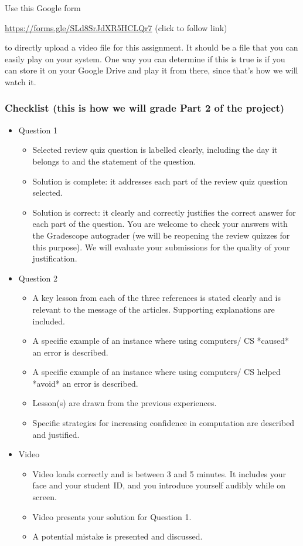 \documentclass[12pt, oneside]{article}
\begin{document}
Use this Google form

\url{https://forms.gle/SLd8SrJdXR5HCLQr7}  (click to follow link) 

to directly upload a video file for this assignment.
It should be a file that you can easily play on your system. 
One way you can determine if this is true is if you can store it on your Google Drive and play it from there,
since that's how we will watch it.

\subsubsection*{Checklist (this is how we will grade Part 2 of the project)}
\begin{itemize}
\item Question 1
    \begin{itemize}
        \item Selected review quiz question is labelled clearly, including the day 
        it belongs to and the statement of the question.
        \item Solution is complete: it addresses each part of the review quiz question selected.
        \item Solution is correct: it clearly and correctly justifies the correct answer 
        for each part of the question. You are welcome to check your answers with the 
        Gradescope autograder (we will be reopening the review quizzes for this purpose). 
        We will evaluate your submissions for the quality of your justification.
    \end{itemize}
\item Question 2
    \begin{itemize}
        \item A key lesson from each of the three references is stated clearly and 
        is relevant to the message of the articles. Supporting explanations are included.
        \item A specific example of an instance where using computers/ CS *caused* an error is described.
        \item A specific example of an instance where using computers/ CS helped *avoid* an error is described.
        \item Lesson(s) are drawn from the previous experiences.
        \item Specific strategies for increasing confidence in computation are described and justified.
    \end{itemize}
    \item Video
    \begin{itemize}
        \item Video loads correctly and is between 3 and 5 minutes. It includes your face and your student ID, 
        and you introduce yourself audibly while on screen.
        \item Video presents your solution for Question 1.
        \item A potential mistake is presented and discussed.
    \end{itemize}
\end{itemize}
\end{document}
